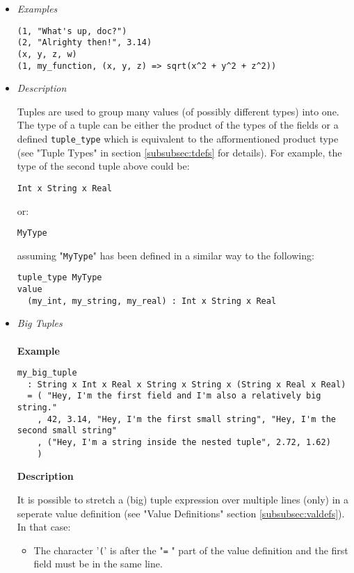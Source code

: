 \documentclass{article}
\begin{document}
\begin{itemize}

\item \textit{Examples}
\begin{verbatim}
(1, "What's up, doc?")
(2, "Alrighty then!", 3.14)
(x, y, z, w)
(1, my_function, (x, y, z) => sqrt(x^2 + y^2 + z^2))
\end{verbatim}

\item \textit{Description} 

Tuples are used to group many values (of possibly different types) into one.
The type of a tuple can be either the product of the types of the fields or a
defined \verb|tuple_type| which is equivalent to the afformentioned product
type (see "Tuple Types" in section \ref{subsubsec:tdefs} for details). For
example, the type of the second tuple above could be:
\begin{verbatim}
Int x String x Real
\end{verbatim}
or:
\begin{verbatim}
MyType
\end{verbatim}
assuming "\verb|MyType|" has been defined in a similar way to the following:
\begin{verbatim}
tuple_type MyType
value
  (my_int, my_string, my_real) : Int x String x Real
\end{verbatim}

\newpage
\item \textit{Big Tuples}
\\\\
\textbf{Example}
\begin{verbatim}
my_big_tuple
  : String x Int x Real x String x String x (String x Real x Real)
  = ( "Hey, I'm the first field and I'm also a relatively big string."
    , 42, 3.14, "Hey, I'm the first small string", "Hey, I'm the second small string"
    , ("Hey, I'm a string inside the nested tuple", 2.72, 1.62)
    )
\end{verbatim}

\textbf{Description}

It is possible to stretch a (big) tuple expression over multiple lines (only)
in a seperate value definition (see "Value Definitions" section
\ref{subsubsec:valdefs}).  In that case:
\begin{itemize}
\item
The character '\verb|(|' is after the "\verb|=| " part of the value definition
and the first field must be in the same line.


\end{itemize}
\end{itemize}
\end{document}
